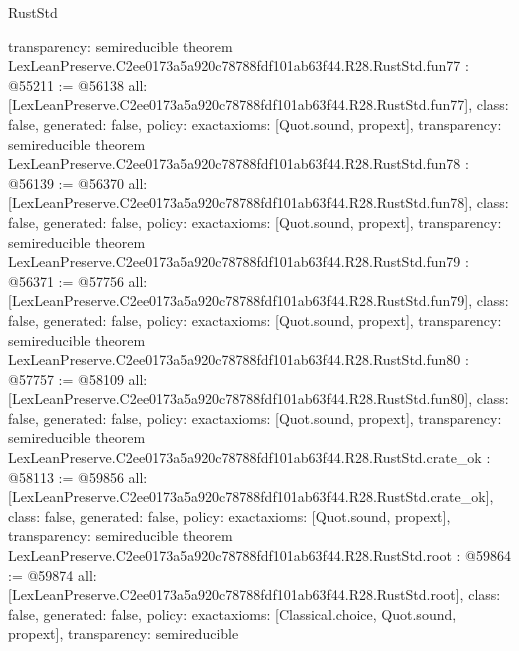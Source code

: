 \begin{lexlean}{RustStd}
\begin{coremodule}
{  transparency: semireducible
}
theorem LexLeanPreserve.C2ee0173a5a920c78788fdf101ab63f44.R28.RustStd.fun77 : @55211 := @56138 {
  all: [LexLeanPreserve.C2ee0173a5a920c78788fdf101ab63f44.R28.RustStd.fun77],
  class: false,
  generated: false,
  policy: exact{axioms: [Quot.sound, propext]},
  transparency: semireducible
}
theorem LexLeanPreserve.C2ee0173a5a920c78788fdf101ab63f44.R28.RustStd.fun78 : @56139 := @56370 {
  all: [LexLeanPreserve.C2ee0173a5a920c78788fdf101ab63f44.R28.RustStd.fun78],
  class: false,
  generated: false,
  policy: exact{axioms: [Quot.sound, propext]},
  transparency: semireducible
}
theorem LexLeanPreserve.C2ee0173a5a920c78788fdf101ab63f44.R28.RustStd.fun79 : @56371 := @57756 {
  all: [LexLeanPreserve.C2ee0173a5a920c78788fdf101ab63f44.R28.RustStd.fun79],
  class: false,
  generated: false,
  policy: exact{axioms: [Quot.sound, propext]},
  transparency: semireducible
}
theorem LexLeanPreserve.C2ee0173a5a920c78788fdf101ab63f44.R28.RustStd.fun80 : @57757 := @58109 {
  all: [LexLeanPreserve.C2ee0173a5a920c78788fdf101ab63f44.R28.RustStd.fun80],
  class: false,
  generated: false,
  policy: exact{axioms: [Quot.sound, propext]},
  transparency: semireducible
}
theorem LexLeanPreserve.C2ee0173a5a920c78788fdf101ab63f44.R28.RustStd.crate_ok : @58113 := @59856 {
  all: [LexLeanPreserve.C2ee0173a5a920c78788fdf101ab63f44.R28.RustStd.crate_ok],
  class: false,
  generated: false,
  policy: exact{axioms: [Quot.sound, propext]},
  transparency: semireducible
}
theorem LexLeanPreserve.C2ee0173a5a920c78788fdf101ab63f44.R28.RustStd.root : @59864 := @59874 {
  all: [LexLeanPreserve.C2ee0173a5a920c78788fdf101ab63f44.R28.RustStd.root],
  class: false,
  generated: false,
  policy: exact{axioms: [Classical.choice, Quot.sound, propext]},
  transparency: semireducible
}


\end{coremodule}
\end{lexlean}
